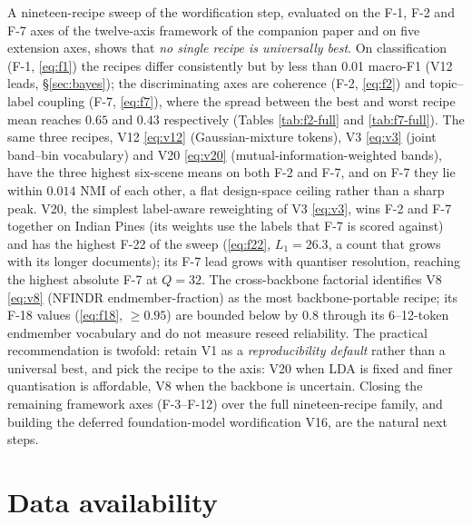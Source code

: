 \documentclass[journal,a4paper,10pt]{IEEEtran}
\begin{document}
A nineteen-recipe sweep of the wordification step, evaluated on the
F-1, F-2 and F-7 axes of the twelve-axis framework of the companion
paper and on five extension axes, shows that
\emph{no single recipe is universally best}. On classification (F-1,
\eqref{eq:f1}) the recipes differ consistently but by less than 0.01
macro-F1 (V12 leads, \S\ref{sec:bayes}); the discriminating axes are coherence (F-2,
\eqref{eq:f2}) and topic--label coupling (F-7, \eqref{eq:f7}), where
the spread between the best and worst recipe mean reaches $0.65$ and
$0.43$ respectively (Tables \ref{tab:f2-full} and \ref{tab:f7-full}).
The same three
recipes, V12 \eqref{eq:v12} (Gaussian-mixture tokens), V3
\eqref{eq:v3} (joint band--bin vocabulary) and V20 \eqref{eq:v20}
(mutual-information-weighted bands), have the three highest six-scene
means on both F-2 and F-7, and on F-7 they lie within $0.014$ NMI of
each other, a flat design-space ceiling rather than a sharp peak.
V20, the simplest label-aware reweighting of V3 \eqref{eq:v3}, wins
F-2 and F-7 together on Indian Pines (its weights use the labels that
F-7 is scored against) and has the highest F-22 of the sweep
(\eqref{eq:f22}, $L_1 = 26.3$, a count that grows with its longer
documents); its F-7 lead grows with quantiser resolution, reaching the
highest absolute F-7 at $Q = 32$. The
cross-backbone factorial identifies V8 \eqref{eq:v8} (NFINDR
endmember-fraction) as the most backbone-portable recipe; its F-18
values (\eqref{eq:f18}, $\ge 0.95$) are bounded below by 0.8 through
its 6--12-token endmember vocabulary and do not measure reseed
reliability. The practical
recommendation is twofold: retain V1 as a \emph{reproducibility
default} rather than a universal best, and pick the recipe to the
axis: V20 when LDA is fixed and finer quantisation is affordable,
V8 when the backbone is uncertain.
Closing the remaining framework axes (F-3--F-12) over the full
nineteen-recipe family, and building the deferred foundation-model
wordification V16, are the natural next steps.

\section*{Data availability}
\end{document}

